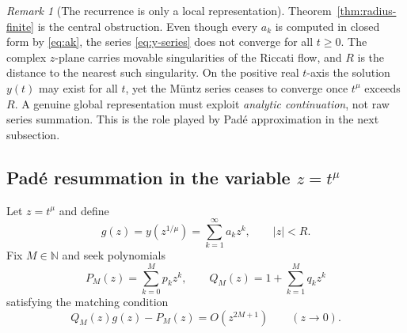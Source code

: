 \documentclass[11pt]{article}
\theoremstyle{definition}
\theoremstyle{remark}
\newtheorem{remark}[theorem]{Remark}
\begin{document}
\begin{remark}[The recurrence is only a local representation]
\label{rem:local}
Theorem~\ref{thm:radius-finite} is the central obstruction. Even though every $a_{k}$ is computed in closed form by \eqref{eq:ak}, the series \eqref{eq:y-series} does not converge for all $t\ge 0$. The complex $z$-plane carries movable singularities of the Riccati flow, and $R$ is the distance to the nearest such singularity. On the positive real $t$-axis the solution $y(t)$ may exist for all $t$, yet the M\"untz series ceases to converge once $t^{\mu}$ exceeds $R$. A genuine global representation must exploit \emph{analytic continuation}, not raw series summation. This is the role played by Pad\'e approximation in the next subsection.
\end{remark}

\subsection{Pad\'e resummation in the variable $z=t^{\mu}$}
\label{sec:heston-pade}

Let $z=t^{\mu}$ and define
\begin{equation}
g(z)=y(z^{1/\mu})=\sum_{k=1}^{\infty}a_{k}z^{k},
\qquad |z|<R.
\label{eq:g-series}
\end{equation}
Fix $M\in\mathbb{N}$ and seek polynomials
\begin{equation}
P_{M}(z)=\sum_{k=0}^{M}p_{k}z^{k},
\qquad Q_{M}(z)=1+\sum_{k=1}^{M}q_{k}z^{k}
\label{eq:PQ-def}
\end{equation}
satisfying the matching condition
\begin{equation}
Q_{M}(z)g(z)-P_{M}(z)=O(z^{2M+1})
\qquad (z\to 0).
\label{eq:pade-match}
\end{equation}
\end{document}
